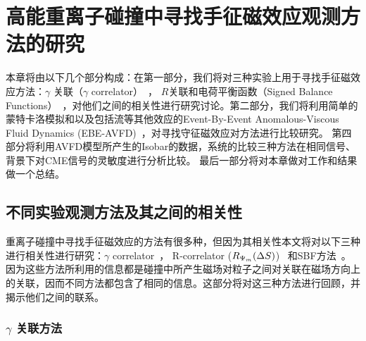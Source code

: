 

\setcounter{section}{0}
\setcounter{figure}{0}
\setcounter{table}{0}
\setcounter{equation}{0}

\chapter[手征磁效应观测方法的研究]{高能重离子碰撞中寻找手征磁效应观测方法的研究 }



本章将由以下几个部分构成：在第一部分，我们将对三种实验上用于寻找手征磁效应方法：$\gamma$ 关联（$\gamma$ correlator）~\cite{Voloshin:2008dg}， $R$关联和电荷平衡函数（Signed Balance Functions）~\cite{Tang2019,Lin2021}，对他们之间的相关性进行研究讨论。第二部分，我们将利用简单的蒙特卡洛模拟和以及包括流等其他效应的Event-By-Event Anomalous-Viscous Fluid Dynamics (EBE-AVFD)~\cite{Shi:2017cpu,Jiang:2016wve,Shi:2019wzi}，对寻找守征磁效应对方法进行比较研究。
第四部分将利用AVFD模型所产生的Isobar的数据，系统的比较三种方法在相同信号、背景下对CME信号的灵敏度进行分析比较。
最后一部分将对本章做对工作和结果做一个总结。

\bigskip

\section{不同实验观测方法及其之间的相关性}
\label{Sec.II}
重离子碰撞中寻找手征磁效应的方法有很多种，但因为其相关性本文将对以下三种进行相关性进行研究：$\gamma$ correlator~\cite{Voloshin:2008dg}， R-correlator ($R_{{\rm \Psi}_m}(\Delta S)$)~\cite{RCorr-2011,RCorr-2018} 和SBF方法~\cite{Tang2019,Lin2021}。因为这些方法所利用的信息都是碰撞中所产生磁场对粒子之间对关联在磁场方向上的关联，因而不同方法都包含了相同的信息。这部分将对这三种方法进行回顾，并揭示他们之间的联系。


\subsection{$\gamma$ 关联方法}


